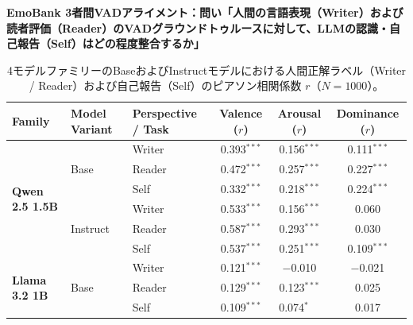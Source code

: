 \begin{table}[htbp]
\centering
\small
\noindent\textbf{EmoBank 3者間VADアライメント：問い「人間の言語表現（Writer）および読者評価（Reader）のVADグラウンドトゥルースに対して、LLMの認識・自己報告（Self）はどの程度整合するか」}\par\vspace{1ex}
\caption{4モデルファミリーのBaseおよびInstructモデルにおける人間正解ラベル（Writer / Reader）および自己報告（Self）のピアソン相関係数 $r$（$N=1000$）。}
\label{tab:behavioral_emobank_3way_vad}
\begin{tabular}{lll ccc}
\toprule
\textbf{Family} & \textbf{Model Variant} & \textbf{Perspective / Task} & \textbf{Valence ($r$)} & \textbf{Arousal ($r$)} & \textbf{Dominance ($r$)} \\
\midrule
\multirow{6}{*}{\textbf{Qwen 2.5 1.5B}} & \multirow{3}{*}{Base}    & Writer     & 0.393$^{***}$            & 0.156$^{***}$            & 0.111$^{***}$            \\
                                 &                          & Reader     & 0.472$^{***}$            & 0.257$^{***}$            & 0.227$^{***}$            \\
                                 &                          & Self       & 0.332$^{***}$            & 0.218$^{***}$            & 0.224$^{***}$            \\
\cmidrule(lr){2-6}
                                 & \multirow{3}{*}{Instruct} & Writer     & 0.533$^{***}$            & 0.156$^{***}$            & 0.060\phantom{$^{***}$}  \\
                                 &                          & Reader     & 0.587$^{***}$            & 0.293$^{***}$            & 0.030\phantom{$^{***}$}  \\
                                 &                          & Self       & 0.537$^{***}$            & 0.251$^{***}$            & 0.109$^{***}$            \\
\midrule
\multirow{6}{*}{\textbf{Llama 3.2 1B}} & \multirow{3}{*}{Base}    & Writer     & 0.121$^{***}$            & $-$0.010\phantom{$^{***}$} & $-$0.021\phantom{$^{***}$} \\
                                 &                          & Reader     & 0.129$^{***}$            & 0.123$^{***}$            & 0.025\phantom{$^{***}$}  \\
                                 &                          & Self       & 0.109$^{***}$            & 0.074$^{*}\phantom{^{**}}$ & 0.017\phantom{$^{***}$}  \\

\end{tabular}
\end{table}
